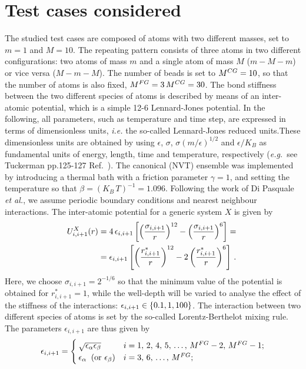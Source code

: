 \documentclass[10pt,a4paper]{book}
\theoremstyle{definition}
\begin{document}
\section{Test cases considered}
\label{Sec:TestCasesConsid}

The studied test cases are composed of atoms with two different masses, set to $m=1$ and $M=10$.
The repeating pattern  consists of three atoms in two different configurations: two atoms of mass $m$ and a single atom of mass $M$ ($m-M-m$) or vice versa ($M-m-M$). The number of beads is set to $M^{CG}=10$, so that the number of atoms is also fixed, $M^{FG}=3\,M^{CG}=30$.
The bond stiffness between the two different species of atoms is described by means of an inter-atomic potential, which is a simple 12-6 Lennard-Jones potential. In the following, all parameters, such as temperature and time step, are expressed in terms of dimensionless units, \textit{i.e.} the so-called Lennard-Jones reduced units.These dimensionless units are obtained by using $\epsilon$, $\sigma$, $\sigma(m/\epsilon)^{1/2}$ and $\epsilon/K_B$ as fundamental units of energy, length, time and temperature, respectively (\textit{e.g.}~see Tuckerman pp.125-127 Ref.~\cite{tuckerman2010}). 
The canonical (NVT) ensemble was implemented by introducing a thermal bath with a friction parameter $\gamma=1$, and setting the temperature so that $\beta=(K_B\,T)^{-1}=1.096$.
Following the work of Di Pasquale \textit{et al.}, we assume periodic boundary conditions and nearest neighbour interactions. 
The inter-atomic potential for a generic system $X$ is given by 
\begin{equation}
 \begin{split}
  	U^X_{i,i+1}(r) &= 4\,\epsilon_{i,i+1} \left[\left(\frac{\sigma_{i,i+1}}{r}\right)^{12} - \left(\frac{\sigma_{i,i+1}}{r}\right)^6\right] ={}\\
	&= \epsilon_{i,i+1} \left[\left(\frac{r^*_{i,i+1}}{r}\right)^{12} - 2\left(\frac{r^*_{i,i+1}}{r}\right)^6\right] \,.
 \end{split}
\end{equation} 
Here, we choose $\sigma_{i,i+1}=2^{-1/6}$ so that the minimum value of the potential is obtained for $r^*_{i,i+1}=1$, while the well-depth will be varied to analyse the effect of the stiffness of the interactions: $\epsilon_{i,i+1}\in\left\lbrace 0.1,1,100\right\rbrace$. The interaction between two different species of atoms is set by the so-called Lorentz-Berthelot mixing rule. The parameters $\epsilon_{i,i+1}$ are thus given by
\begin{equation}
  \epsilon_{i,i+1} = \begin{cases}
    \sqrt{\epsilon_\alpha\epsilon_\beta} & i = 1,\, 2,\, 4,\, 5,\, \dots,\, M^{FG}-2,\, M^{FG}-1; \\
    \epsilon_\alpha\;\;(\mbox{or}\,\,\epsilon_\beta) & i = 3,\, 6,\, \dots,\, M^{FG};
  \end{cases}
\end{equation}
\end{document}
